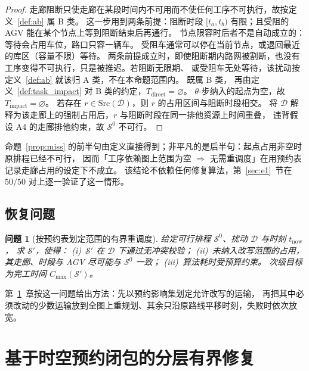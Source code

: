 \documentclass[manuscript,screen,review]{acmart}
\newcommand{\NPairs}{50}
\newcommand{\PassMiss}{\NPairs/\NPairs}      %
\newtheorem{problem}{问题}
\begin{document}
\begin{proof}
走廊阻断只使走廊在某段时间内不可用而不使任何工序不可执行，故按定义~\ref{def:ab} 属 B 类。
这一步用到两条前提：阻断时段 \([t_a,t_b)\) 有限；且受阻的 AGV 能在某个节点上等到阻断结束后再通行。
节点限容时后者不是自动成立的：等待会占用车位，路口只容一辆车。
受阻车通常可以停在当前节点，或退回最近的库区（容量不限）等待。
两条前提成立时，即使阻断期内路网被割断，也没有工序变得不可执行，只是被推迟。若阻断无限期、
或受阻车无处等待，该扰动按定义~\ref{def:ab} 就该归 A 类，不在本命题范围内。
既属 B 类，
再由定义~\ref{def:task_impact} 对 B 类的约定，\(T_{\mathrm{direct}}=\varnothing\)。
\(\theta\)-步纳入的起点为空，故 \(T_{\mathrm{impact}}=\varnothing\)。
若存在 \(r\in\mathrm{Src}(\mathcal{D})\)，则 \(r\) 的占用区间与阻断时段相交。
将 \(\mathcal{D}\) 解释为该走廊上的强制占用后，\(r\) 与阻断时段在同一排他资源上时间重叠，
违背假设 A4 的走廊排他约束，故 \(\mathcal{S}^0\) 不可行。
\end{proof}

命题~\ref{prop:miss} 的前半句由定义直接得到；非平凡的是后半句：起点占用非空时原排程已经不可行，
因而「工序依赖图上范围为空 \(\Rightarrow\) 无需重调度」在用预约表记录走廊占用的设定下不成立。
该结论不依赖任何修复算法，第~\ref{sec:e1}~节在 \(\PassMiss\) 对上逐一验证了这一情形。

\subsection{恢复问题}
\label{sec:recovery_problem}

\begin{problem}[按预约表划定范围的有界重调度]
\label{prob:recovery}
给定可行排程 \(\mathcal{S}^0\)、扰动 \(\mathcal{D}\) 与时刻 \(t_{\mathrm{now}}\)，
求 \(\mathcal{S}'\)，使得：
(i)~\(\mathcal{S}'\) 在 \(\mathcal{D}\) 下通过无冲突校验；
(ii)~未纳入改写范围的占用，其走廊、时段与 AGV 尽可能与 \(\mathcal{S}^0\) 一致；
(iii)~算法耗时受预算约束。
次级目标为完工时间 \(C_{\max}(\mathcal{S}')\)。
\end{problem}

第~\ref{sec:strc}~章按这一问题给出方法：先以预约影响集划定允许改写的运输，
再把其中必须改动的少数运输放到全图上重规划、其余只沿原路线平移时刻，失败时依次放宽。

\section{基于时空预约闭包的分层有界修复}
\label{sec:strc}
\label{sec:repair}
\end{document}
